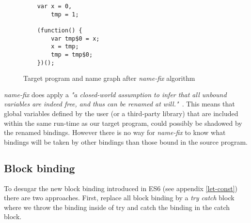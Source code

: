 \begin{figure}[h]
\centering
\begin{minipage}{0.25\linewidth}
\begin{lstlisting}
	var x = 0,
		tmp = 1;

	(function() {
		var tmp$0 = x;
		x = tmp;
		tmp = tmp$0;
	})();
\end{lstlisting}
\end{minipage}
\hfill
\begin{minipage}{0.65\linewidth}
\end{minipage}

\caption{Target program and name graph after \textit{name-fix} algorithm} \label{fig:name-graph-fixed}
\end{figure}

\textit{name-fix} does apply a \textit{"a closed-world assumption to infer that all unbound variables are indeed free, and thus can be renamed at will."}~\cite{Erdweg2014}. This means that global variables defined by the user (or a third-party library) that are included within the same run-time as our target program, could possibly be shadowed by the renamed bindings. However there is no way for \textit{name-fix} to know what bindings will be taken by other bindings than those bound in the source program.

\subsection{Block binding}
To desugar the new block binding introduced in ES6 (see appendix \ref{let-const}) there are two approaches. First, replace all block binding by a \textit{try catch} block where we throw the binding inside of try and catch the binding in the catch block.

